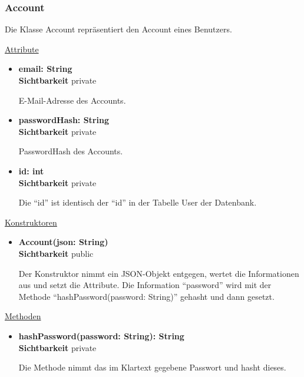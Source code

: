 \subsubsection{Account} \label{service:klasse:Account}
Die Klasse Account repräsentiert den Account eines Benutzers. \newline

\underline{Attribute}
\begin{itemize}
\itemsep0pt
\item \textbf{email: String} \hfill\\ 
\textbf{Sichtbarkeit} private 

E-Mail-Adresse des Accounts.

\item \textbf{passwordHash: String} \hfill\\ 
\textbf{Sichtbarkeit} private 

PasswordHash des Accounts.

\item \textbf{id: int} \hfill\\ 
\textbf{Sichtbarkeit} private  

Die ``id'' ist identisch der ``id'' in der Tabelle User der Datenbank.

\end{itemize}

\underline{Konstruktoren}
\begin{itemize}
\itemsep0pt
\item \textbf{Account(json: String)} \hfill\\
\textbf{Sichtbarkeit} public

Der Konstruktor nimmt ein JSON-Objekt entgegen, wertet die Informationen aus und setzt die Attribute. Die Information ``password'' wird mit der Methode ``hashPassword(password: String)'' gehasht und dann gesetzt.

\end{itemize}

\underline{Methoden}
\begin{itemize}
\itemsep0pt
\item \textbf{hashPassword(password: String): String}\hfill\\
\textbf{Sichtbarkeit} private

Die Methode nimmt das im Klartext gegebene Passwort und hasht dieses.

\end{itemize}